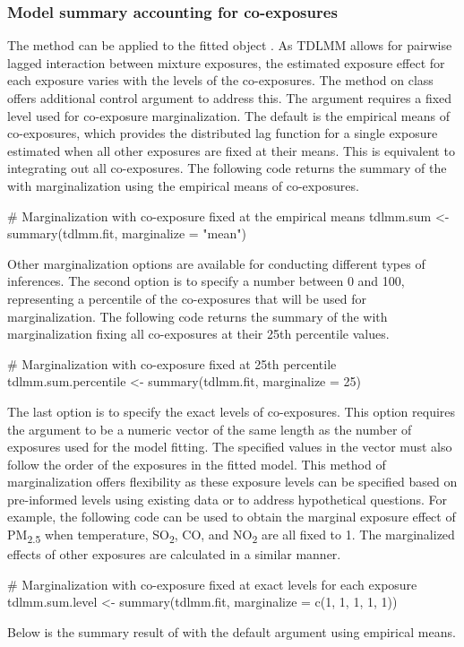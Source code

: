 \subsubsection{Model summary accounting for co-exposures}
The  method can be applied to the fitted object . As TDLMM allows for pairwise lagged interaction between mixture exposures, the estimated exposure effect for each exposure varies with the levels of the co-exposures. The  method on class  offers additional control argument  to address this. The argument  requires a fixed level used for co-exposure marginalization. The default is the empirical means of co-exposures, which provides the distributed lag function for a single exposure estimated when all other exposures are fixed at their means. This is equivalent to integrating out all co-exposures. The following code returns the summary of the  with marginalization using the empirical means of co-exposures.
\begin{example}
# Marginalization with co-exposure fixed at the empirical means
tdlmm.sum <- summary(tdlmm.fit, marginalize = "mean")
\end{example}
Other marginalization options are available for conducting different types of inferences. The second option is to specify a number between 0 and 100, representing a percentile of the co-exposures that will be used for marginalization. The following code returns the summary of the  with marginalization fixing all co-exposures at their 25th percentile values.
\begin{example}
# Marginalization with co-exposure fixed at 25th percentile
tdlmm.sum.percentile <- summary(tdlmm.fit, marginalize = 25)
\end{example}
The last option is to specify the exact levels of co-exposures. This option requires the argument  to be a numeric vector of the same length as the number of exposures used for the model fitting. The specified values in the vector must also follow the order of the exposures in the fitted model. This method of marginalization offers flexibility as these exposure levels can be specified based on pre-informed levels using existing data or to address hypothetical questions. For example, the following code can be used to obtain the marginal exposure effect of PM\textsubscript{2.5} when temperature, SO\textsubscript{2}, CO, and NO\textsubscript{2} are all fixed to 1. The marginalized effects of other exposures are calculated in a similar manner.
\begin{example}
# Marginalization with co-exposure fixed at exact levels for each exposure
tdlmm.sum.level <- summary(tdlmm.fit, marginalize = c(1, 1, 1, 1, 1))
\end{example}
Below is the summary result of  with the default argument using empirical means.

